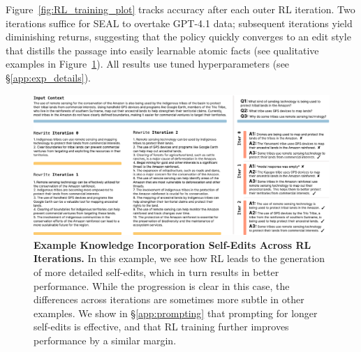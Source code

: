 \documentclass{article}
\newcommand{\methodacronym}{SEAL\xspace}
\begin{document}
Figure~\ref{fig:RL_training_plot} tracks accuracy after each outer RL iteration. Two iterations suffice for \methodacronym{} to overtake GPT-4.1 data; subsequent iterations yield diminishing returns, suggesting that the policy quickly converges to an edit style that distills the passage into easily learnable atomic facts (see qualitative examples in Figure~\ref{fig:knowledge_examples}). All results use tuned hyperparameters (see \S\ref{app:exp_details}).

\begin{figure}[h]
    \centering
    \includegraphics[width=1\linewidth]{figures/CPT_analysis.pdf}
    \vspace{-10pt}
    \caption{\textbf{Example Knowledge Incorporation Self-Edits Across RL Iterations.} In this example, we see how RL leads to the generation of more detailed self-edits, which in turn results in better performance. While the progression is clear in this case, the differences across iterations are sometimes more subtle in other examples. We show in \S\ref{app:prompting} that prompting for longer self-edits is effective, and that RL training further improves performance by a similar margin.}
    \label{fig:knowledge_examples}
\end{figure}

\vspace{10pt}
\end{document}
